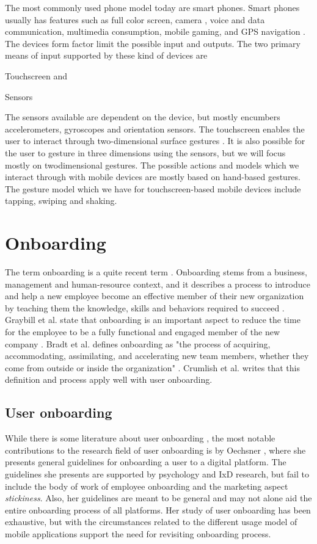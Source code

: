 The most commonly used phone model today are smart phones. Smart phones usually has features such as full color screen, camera \cite{Yu2012}, voice and data communication, multimedia consumption, mobile gaming, and GPS navigation \cite{Ruiz2011}. The devices form factor limit the possible input and outputs. The two primary means of input supported by these kind of devices are
\begin{enumerate*}
  \item Touchscreen and
  \item Sensors
\end{enumerate*}

The sensors available are dependent on the device, but mostly encumbers accelerometers, gyroscopes and orientation sensors. The touchscreen enables the user to interact through two-dimensional surface gestures \cite{Ruiz2011}. It is also possible for the user to gesture in three dimensions using the sensors, but we will focus mostly on twodimensional gestures. The possible actions and models which we interact through with mobile devices are mostly based on hand-based gestures. The gesture model which we have for touchscreen-based mobile devices include tapping, swiping and shaking.

\section{Onboarding}
The term onboarding is a quite recent term \cite{Dai2007}. Onboarding stems from a business, management and human-resource context, and it describes a process to introduce and help a new employee become an effective member of their new organization by teaching them the knowledge, skills and behaviors required to succeed \cite{Bauer2011}. Graybill et al. state that onboarding is an important aspect to reduce the time for the employee to be a fully functional and engaged member of the new company \cite{GraybillJolieO;HudsonCarpenterMariaTaesil;OffordJeromeJr;PiorunMary;Shaffer2013}. Bradt et al. defines onboarding as "the process of acquiring, accommodating, assimilating, and accelerating new team members, whether they come from outside or inside the organization" \cite{Bradt2009}. Crumlish et al. \cite{Crumlish2009} writes that this definition and process apply well with user onboarding.

\subsection{User onboarding}
While there is some literature about user onboarding \cite{Thomsen2016}, the most notable contributions to the research field of user onboarding is by Oechsner \cite{Oechsner2016}, where she presents general guidelines for onboarding a user to a digital platform. The guidelines she presents are supported by psychology and IxD research, but fail to include the body of work of employee onboarding and the marketing aspect \textit{stickiness}. Also, her guidelines are meant to be general and may not alone aid the entire onboarding process of all platforms. Her study of user onboarding has been exhaustive, but with the circumstances related to the different usage model of mobile applications support the need for revisiting onboarding process.
